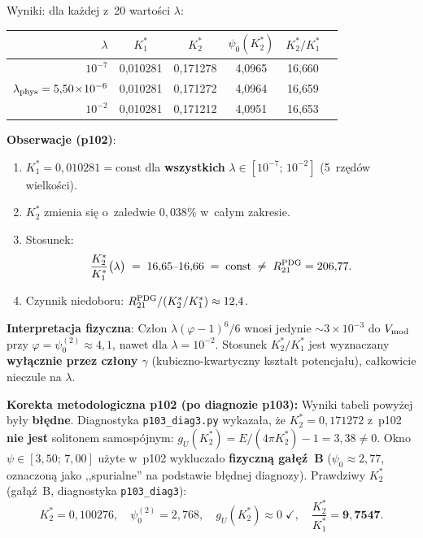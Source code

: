 \begin{remark}
Wyniki: dla ka\.zdej z~20 warto\'sci $\lambda$:
\begin{center}\small
\begin{tabular}{@{}rccccc@{}}
\toprule
$\lambda$ & $K^*_1$ & $K^*_2$ & $\psi_0(K^*_2)$ & $K^*_2/K^*_1$ \\
\midrule
$10^{-7}$ & 0{,}010281 & 0{,}171278 & 4{,}0965 & 16{,}660 \\
$\lambda_{\rm phys} = 5{,}50\!\times\!10^{-6}$ & 0{,}010281 & 0{,}171272 & 4{,}0964 & 16{,}659 \\
$10^{-2}$ & 0{,}010281 & 0{,}171212 & 4{,}0951 & 16{,}653 \\
\bottomrule
\end{tabular}
\end{center}
\textbf{Obserwacje (p102)}:
\begin{enumerate}[nosep]
  \item $K^*_1 = 0{,}010281 = \mathrm{const}$ dla \textbf{wszystkich}
    $\lambda \in [10^{-7};\,10^{-2}]$ (5~rz\k{e}d\'ow wielko\'sci).
  \item $K^*_2$ zmienia si\k{e} o~zaledwie $0{,}038\%$ w~ca\l{}ym zakresie.
  \item Stosunek:
    \begin{equation}\label{eq:K2K1-lambda-scan}
      \frac{K^*_2}{K^*_1}\bigl(\lambda\bigr)
        \;=\; 16{,}65\text{--}16{,}66
        \;=\; \mathrm{const}
        \;\neq\; R_{21}^{\rm PDG} = 206{,}77.
    \end{equation}
  \item Czynnik niedoboru: $R_{21}^{\rm PDG} / (K^*_2/K^*_1) \approx 12{,}4$.
\end{enumerate}
\textbf{Interpretacja fizyczna}:
Cz\l{}on $\lambda(\varphi-1)^6/6$ wnosi jedynie
$\sim 3\!\times\!10^{-3}$ do $V_{\rm mod}$ przy $\varphi = \psi_0^{(2)} \approx 4{,}1$,
nawet dla $\lambda = 10^{-2}$.
Stosunek $K^*_2/K^*_1$ jest wyznaczany \textbf{wy\l{}\k{a}cznie przez cz\l{}ony $\gamma$}
(kubiczno-kwartyczny kszta\l{}t potencja\l{}u), ca\l{}kowicie nieczule na $\lambda$.

\textbf{Korekta metodologiczna p102 (po diagnozie p103):}
Wyniki tabeli powy\.zej by\l{}y \textbf{b\l{}\k{e}dne}.
Diagnostyka \texttt{p103\_diag3.py} wykaza\l{}a, \.ze
$K^*_2 = 0{,}171272$ z~p102 \textbf{nie jest} solitonem samospójnym:
$g_U(K^*_2) = E/(4\pi K^*_2) - 1 = 3{,}38 \neq 0$.
Okno $\psi \in [3{,}50;\,7{,}00]$ u\.zyte w~p102 wyklucza\l{}o
\textbf{fizyczn\k{a} ga\l{}\k{e}\'z~B} ($\psi_0 \approx 2{,}77$, oznaczon\k{a} jako
,,spurialne'' na podstawie b\l{}\k{e}dnej diagnozy).
Prawdziwy $K^*_2$ (ga\l{}\k{a}\'z~B, diagnostyka \texttt{p103\_diag3}):
\begin{equation}\label{eq:K2-true}
  K^*_2 = 0{,}100276, \quad
  \psi_0^{(2)} = 2{,}768, \quad
  g_U(K^*_2) \approx 0 \;\checkmark, \quad
  \frac{K^*_2}{K^*_1} = \mathbf{9{,}7547}.
\end{equation}


\end{remark}
